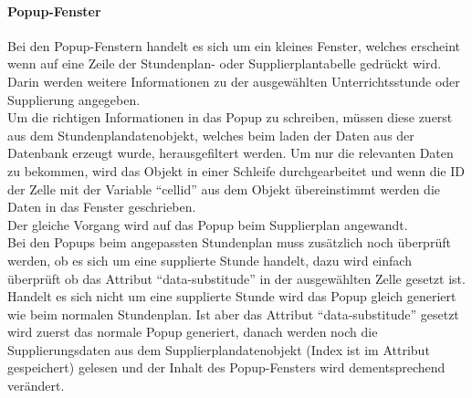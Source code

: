 \paragraph{Popup-Fenster\\}
Bei den Popup-Fenstern handelt es sich um ein kleines Fenster, welches erscheint wenn auf eine Zeile der Stundenplan- oder Supplierplantabelle gedrückt wird. Darin werden weitere Informationen zu der ausgewählten Unterrichtsstunde oder Supplierung angegeben.\\
Um die richtigen Informationen in das Popup zu schreiben, müssen diese zuerst aus dem Stundenplandatenobjekt, welches beim laden der Daten aus der Datenbank erzeugt wurde, herausgefiltert werden. Um nur die relevanten Daten zu bekommen, wird das Objekt in einer Schleife durchgearbeitet und wenn die ID der Zelle mit der Variable \enquote{cellid} aus dem Objekt übereinstimmt werden die Daten in das Fenster geschrieben.\\
Der gleiche Vorgang wird auf das Popup beim Supplierplan angewandt.\\
Bei den Popups beim angepassten Stundenplan muss zusätzlich noch überprüft werden, ob es sich um eine supplierte Stunde handelt, dazu wird einfach überprüft ob das Attribut \enquote{data-substitude} in der ausgewählten Zelle gesetzt ist. Handelt es sich nicht um eine supplierte Stunde wird das Popup gleich generiert wie beim normalen Stundenplan. Ist aber das Attribut \enquote{data-substitude} gesetzt wird zuerst das normale Popup generiert, danach werden noch die Supplierungsdaten aus dem Supplierplandatenobjekt (Index ist im Attribut gespeichert) gelesen und der Inhalt des Popup-Fensters wird dementsprechend verändert.\\


